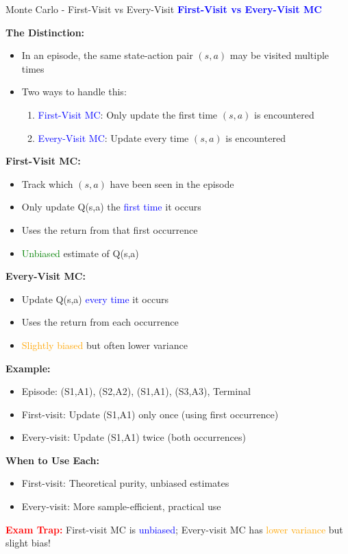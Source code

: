 \documentclass[8pt]{beamer}
\begin{document}
	\begin{frame}{Monte Carlo - First-Visit vs Every-Visit}
		\fontsize{6.5}{7.5}\selectfont
		\textcolor{blue}{\textbf{First-Visit vs Every-Visit MC}}
		
		\textbf{The Distinction:}
		\begin{itemize}
			\item In an episode, the same state-action pair $(s,a)$ may be visited multiple times
			\item Two ways to handle this:
			\begin{enumerate}
				\item \textcolor{blue}{First-Visit MC}: Only update the first time $(s,a)$ is encountered
				\item \textcolor{blue}{Every-Visit MC}: Update every time $(s,a)$ is encountered
			\end{enumerate}
		\end{itemize}
		
		\textbf{First-Visit MC:}
		\begin{itemize}
			\item Track which $(s,a)$ have been seen in the episode
			\item Only update Q(s,a) the \textcolor{blue}{first time} it occurs
			\item Uses the return from that first occurrence
			\item \textcolor{green}{Unbiased} estimate of Q(s,a)
		\end{itemize}
		
		\textbf{Every-Visit MC:}
		\begin{itemize}
			\item Update Q(s,a) \textcolor{blue}{every time} it occurs
			\item Uses the return from each occurrence
			\item \textcolor{orange}{Slightly biased} but often lower variance
		\end{itemize}
		
		\textbf{Example:}
		\begin{itemize}
			\item Episode: (S1,A1), (S2,A2), (S1,A1), (S3,A3), Terminal
			\item First-visit: Update (S1,A1) only once (using first occurrence)
			\item Every-visit: Update (S1,A1) twice (both occurrences)
		\end{itemize}
		
		\textbf{When to Use Each:}
		\begin{itemize}
			\item First-visit: Theoretical purity, unbiased estimates
			\item Every-visit: More sample-efficient, practical use
		\end{itemize}
		
		\textcolor{red}{\textbf{Exam Trap:}} First-visit MC is \textcolor{blue}{unbiased}; Every-visit MC has \textcolor{orange}{lower variance} but slight bias!
	\end{frame}
	
\end{document}
